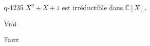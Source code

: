 \begin{truefalse}{q-1235}
$X^2+X+1$ est irréductible dans $\mathbb{C}[X]$.
\item Vrai
\item* Faux
\end{truefalse}

